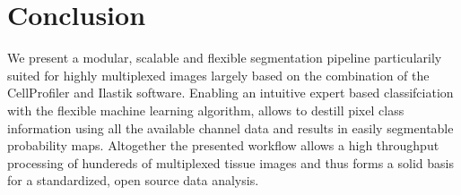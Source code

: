 \documentclass[a4paper]{article}
\begin{document}
\section{Conclusion}

We present a modular, scalable and flexible segmentation pipeline particularily suited for highly
multiplexed images largely based on the combination of the CellProfiler and Ilastik software.
Enabling an intuitive expert based classifciation with the flexible machine learning algorithm,
allows to destill pixel class information using all the available channel data and results in
easily segmentable probability maps. Altogether the presented workflow allows a high throughput
processing of hundereds of multiplexed tissue images and thus forms a solid basis for a
standardized, open source data analysis.



\end{document}
